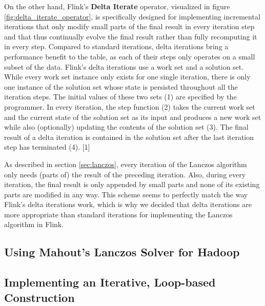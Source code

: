 On the other hand, Flink's \textbf{Delta Iterate} operator, visualized in figure 
\ref{fig:delta_iterate_operator}, is specifically designed for implementing incremental
iterations that only modify small parts of the final result in every iteration step and that 
thus continually evolve the final result rather than fully recomputing it in every step.
Compared to standard iterations, delta iterations bring a performance benefit to the table,
as each of their steps only operates on a small subset of the data. Flink's delta iterations
use a work set and a solution set. While every work set instance only exists for one single
iteration, there is only one instance of the solution set whose state is persisted throughout 
all the iteration steps. The initial values of these two sets (1) are specified by the 
programmer. In every iteration, the step function (2) takes the current work set and the current
state of the solution set as its input and produces a new work set while also (optionally)
updating the contents of the solution set (3). The final result of a delta iteration is
contained in the solution set after the last iteration step has terminated (4). [1]


As described in section \ref{sec:lanczos}, every iteration of the Lanczos algorithm only needs
(parts of) the result of the preceding iteration. Also, during every iteration, the final result
is only appended by small parts and none of its existing parts are modified in any way. This
scheme seems to perfectly match the way Flink's delta iterations work, which is why we decided
that delta iterations are more appropriate than standard iterations for implementing the Lanczos
algorithm in Flink.

\subsection{Using Mahout's Lanczos Solver for Hadoop}


\subsection{Implementing an Iterative, Loop-based Construction}

